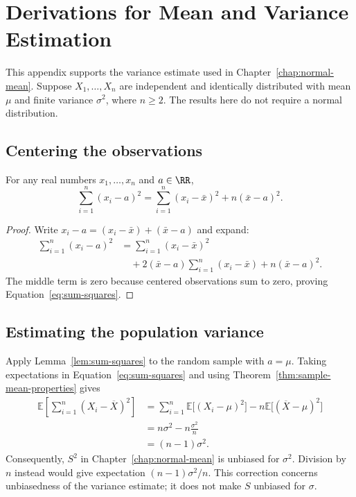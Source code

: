 \chapter{Derivations for Mean and Variance Estimation}
\label{app:variance}


This appendix supports the variance estimate used in
Chapter~\ref{chap:normal-mean}. Suppose $X_1,\ldots,X_n$ are independent and
identically distributed with mean $\mu$ and finite variance $\sigma^2$, where
$n\geq 2$. The results here do not require a normal distribution.


\section{Centering the observations}
\begin{lemma}
  \label{lem:sum-squares}
  For any real numbers $x_1,\ldots,x_n$ and $a\in\RR$,
  \begin{equation}
    \label{eq:sum-squares}
    \sum_{i=1}^{n}(x_i-a)^2
    = \sum_{i=1}^{n}(x_i-\bar{x})^2+n(\bar{x}-a)^2.
  \end{equation}
\end{lemma}
\begin{proof}
  Write $x_i-a=(x_i-\bar{x})+(\bar{x}-a)$ and expand:
  \begin{align*}
    \sum_{i=1}^{n}(x_i-a)^2
      &= \sum_{i=1}^{n}(x_i-\bar{x})^2 \\
      &\quad +2(\bar{x}-a)\sum_{i=1}^{n}(x_i-\bar{x})
        +n(\bar{x}-a)^2.
  \end{align*}
  The middle term is zero because centered observations sum to zero, proving
  Equation~\eqref{eq:sum-squares}.
\end{proof}


\section{Estimating the population variance}
Apply Lemma~\ref{lem:sum-squares} to the random sample with $a=\mu$.
Taking expectations in Equation~\eqref{eq:sum-squares} and using
Theorem~\ref{thm:sample-mean-properties} gives
\begin{align*}
  \mathbb{E}\left[\sum_{i=1}^{n}(X_i-\overline{X})^2\right]
    &= \sum_{i=1}^{n}\mathbb{E}\bigl[(X_i-\mu)^2\bigr]
       -n\mathbb{E}\bigl[(\overline{X}-\mu)^2\bigr] \\
    &= n\sigma^2-n\frac{\sigma^2}{n} \\
    &= (n-1)\sigma^2.
\end{align*}
Consequently, $S^2$ in Chapter~\ref{chap:normal-mean} is unbiased for
$\sigma^2$. Division by $n$ instead would give expectation
$(n-1)\sigma^2/n$. This correction concerns unbiasedness of the variance
estimate; it does not make $S$ unbiased for $\sigma$.



